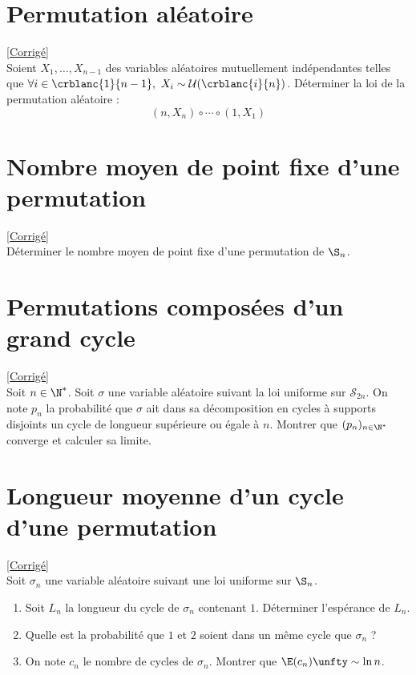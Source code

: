 \documentclass[8pt]{book}
\begin{document}
\section{Permutation aléatoire}
\label{Permutation aléatoire}
\textcolor{blue}{\hyperref[Permutation aléatoire corrigé]{[Corrigé]}}\\
Soient $X_1,\dots,X_{n-1}$ des variables aléatoires mutuellement indépendantes telles que $\forall i\in \crblanc{1}{n-1},\ X_i\sim\mathcal U(\crblanc{i}{n})$. Déterminer la loi de la permutation aléatoire :
$$(n,X_n)\circ\cdots\circ(1,X_1)$$

\section{Nombre moyen de point fixe d'une permutation }
\label{Nombre moyen de point fixe d'une permutation}
\textcolor{blue}{\hyperref[Nombre moyen de point fixe d'une permutation corrigé]{[Corrigé]}}\\
Déterminer le nombre moyen de point fixe d'une permutation de $\S_n$.

\section{Permutations composées d'un grand cycle}
\label{Permutations composées d'un grand cycle}
\textcolor{blue}{\hyperref[Permutations composées d'un grand cycle corrigé]{[Corrigé]}}\\
Soit $n\in \N^*$. Soit $\sigma$ une variable aléatoire suivant la loi uniforme sur $\mathcal S_{2n}$. On note $p_n$ la probabilité que $\sigma$ ait dans sa décomposition en cycles à supports disjoints un cycle de longueur supérieure ou égale à $n$. Montrer que $(p_n)_{n\in \N^*}$ converge et calculer sa limite.

\section{Longueur moyenne d'un cycle d'une permutation}
\label{Longueur moyenne d'un cycle d'une permutation}
\textcolor{blue}{\hyperref[Longueur moyenne d'un cycle d'une permutation corrigé]{[Corrigé]}}\\
Soit $\sigma_n$ une variable aléatoire suivant une loi uniforme sur $\S_n$.
\begin{enumerate}
	\item Soit $L_n$ la longueur du cycle de $\sigma_n$ contenant $1$. Déterminer l'espérance de $L_n$.
	\item Quelle est la probabilité que $1$ et $2$ soient dans un même cycle que $\sigma_n$ ?
	\item On note $c_n$ le nombre de cycles de $\sigma_n$. Montrer que $\E(c_n)\unfty\sim\ln n$.
\end{enumerate}
\end{document}

